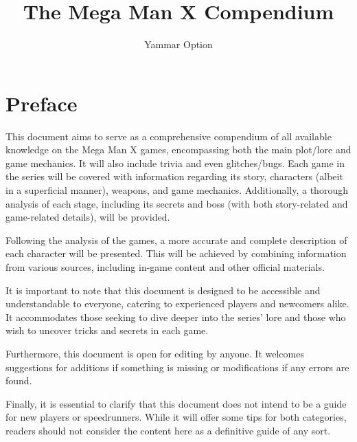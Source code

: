 \documentclass[openany]{report}
\title{The Mega Man X Compendium}
\author{Yammar Option}
\begin{document}
\begin{titlepage}
	\maketitle
	\thispagestyle{empty}
\end{titlepage}

\hypersetup{linkcolor=black}{\tableofcontents}


	\section*{Preface}
	This document aims to serve as a comprehensive compendium of all available knowledge on the Mega Man X games, encompassing both the main plot/lore and game mechanics. It will also include trivia and even glitches/bugs. Each game in the series will be covered with information regarding its story, characters (albeit in a superficial manner), weapons, and game mechanics. Additionally, a thorough analysis of each stage, including its secrets and boss (with both story-related and game-related details), will be provided.
	
	Following the analysis of the games, a more accurate and complete description of each character will be presented. This will be achieved by combining information from various sources, including in-game content and other official materials.
	
	It is important to note that this document is designed to be accessible and understandable to everyone, catering to experienced players and newcomers alike. It accommodates those seeking to dive deeper into the series' lore and those who wish to uncover tricks and secrets in each game.
	
	Furthermore, this document is open for editing by anyone. It welcomes suggestions for additions if something is missing or modifications if any errors are found.
	
	Finally, it is essential to clarify that this document does not intend to be a guide for new players or speedrunners. While it will offer some tips for both categories, readers should not consider the content here as a definitive guide of any sort.
	
\end{document}
